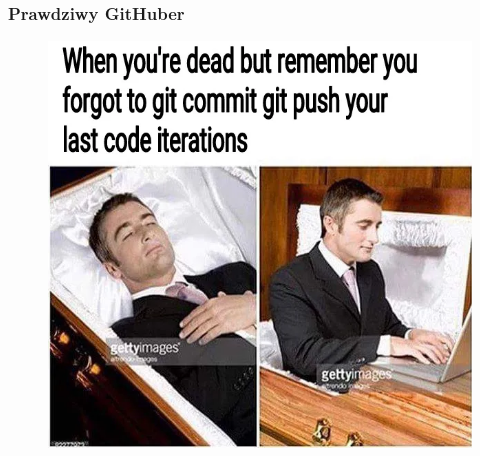 \documentclass[10pt,t]{beamer}
\begin{document}
\begin{frame}
  \frametitle{Prawdziwy GitHuber}


  \begin{figure}

    \centering


    \includegraphics[scale=0.34]
    {./PresentationsPictures/True-GitHuber.png}

  \end{figure}

\end{frame}
\end{document}
